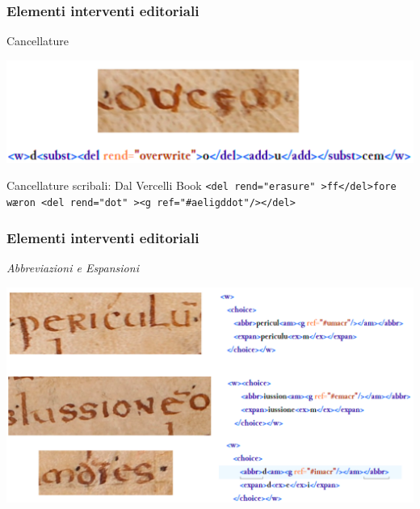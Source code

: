 \begin{frame}
    \frametitle{Elementi interventi editoriali}
    \addtocounter{nframe}{1}
    
    \begin{block}{Cancellature}
        \begin{center}
            \includegraphics[width=.9\textwidth]{imgs/Cancellature.png}
        \end{center}
    \end{block}
   
    \begin{block}{Cancellature scribali: Dal Vercelli Book}
        \texttt{<del rend="erasure" >ff</del>fore wæron
        <del rend="dot" ><g ref="\#aeligddot"/></del>}
    \end{block}
    
\end{frame} 


\begin{frame}
    \frametitle{Elementi interventi editoriali}
    \addtocounter{nframe}{1}
    
   
    \textit{Abbreviazioni e Espansioni}
        \begin{center}
            \includegraphics[width=.95\textwidth]{imgs/Abbreviazioni-1.png}
        \end{center}

    
\end{frame}

